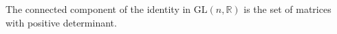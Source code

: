 The connected component of the identity in $\mathrm{GL}(n, \mathbb{R})$ is the set of matrices with positive determinant.

